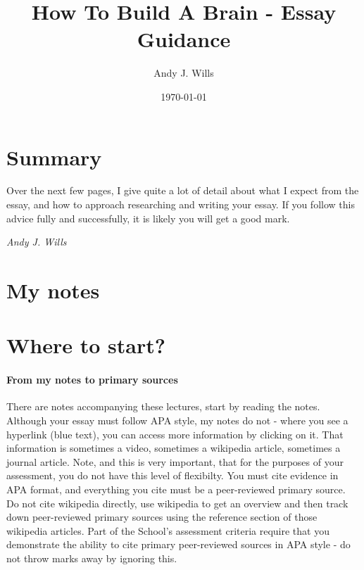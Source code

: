 \documentclass[11pt]{article}
\begin{document}
\title{How To Build A Brain - Essay Guidance}

\author{Andy J. Wills}
\date{\today}
\maketitle


\section*{Summary}
Over the next few pages, I give quite a lot of detail about what I expect from the essay, and how to approach researching and writing your essay. If you follow this advice fully and successfully, it is likely you will get a good mark.

\begin{flushright}
	\emph{Andy J. Wills}
\end{flushright}

\section*{My notes}



\section*{Where to start?}

\paragraph{From my notes to primary sources} There are notes accompanying these lectures, start by reading the notes. Although your essay must follow APA style, my notes do not - where you see a hyperlink (blue text), you can access more information by clicking on it. That information is sometimes a video, sometimes a wikipedia article, sometimes a journal article. Note, and this is very important, that for the purposes of your assessment, you do not have this level of flexibilty. You must cite evidence in APA format, and everything you cite must be a peer-reviewed primary source. Do not cite wikipedia directly, use wikipedia to get an overview and then track down peer-reviewed primary sources using the reference section of those wikipedia articles. Part of the School's assessment criteria require that you demonstrate the ability to cite primary peer-reviewed sources in APA style - do not throw marks away by ignoring this.  
\end{document}
